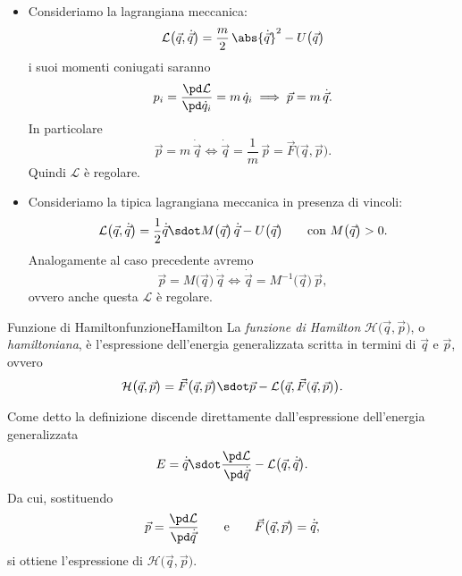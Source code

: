 \begin{ese}
	\begin{itemize}
		\item Consideriamo la lagrangiana meccanica:
		      \[
			      \mathcal{L}\big(\vec{q},\dot{\vec{q}}\big) = \frac{m}{2}\,\abs{\dot{\vec{q}}}^2 -U\big(\vec{q}\big)
		      \]
		      i suoi momenti coniugati saranno
		      \[
			      p_i = \frac{\pd\mathcal{L}}{\pd\dot{q}_i} = m\,\dot{q}_i \implies \vec{p} = m\,\dot{\vec{q}}.
		      \]
		      In particolare
		      \[
			      \vec{p}=m\,\dot{\vec{q}} \iff \dot{\vec{q}} = \frac{1}{m}\,\vec{p} = \vec{F}\big(\vec{q},\vec{p}\big).
		      \]
		      Quindi \(\mathcal{L}\) è regolare.
		\item Consideriamo la tipica lagrangiana meccanica in presenza di vincoli:
		      \[
			      \mathcal{L}\big(\vec{q},\dot{\vec{q}}\big) = \frac{1}{2}\dot{\vec{q}} \sdot M\big(\vec{q}\big)\,\dot{\vec{q}}-U\big(\vec{q}\big) \qquad\text{con }M\big(\vec{q}\big) > 0.
		      \]
		      Analogamente al caso precedente avremo
		      \[
			      \vec{p} = M\big(\vec{q}\big)\,\dot{\vec{q}} \iff \dot{\vec{q}}=M^{-1}\big(\vec{q}\big)\,\vec{p},
		      \]
		      ovvero anche questa \(\mathcal{L}\) è regolare.
	\end{itemize}
\end{ese}

\begin{defn}{Funzione di Hamilton}{funzioneHamilton}
	La \emph{funzione di Hamilton} \(\mathcal{H}\big(\vec{q},\vec{p}\big)\), o \emph{hamiltoniana}, è l'espressione dell'energia generalizzata scritta in termini di \(\vec{q}\) e \(\vec{p}\), ovvero
	\[
		\mathcal{H}\big(\vec{q},\vec{p}\big) = \vec{F}\big(\vec{q},\vec{p}\big) \sdot \vec{p} - \mathcal{L}\big(\vec{q},\vec{F}(\vec{q},\vec{p})\big).
	\]
\end{defn}

\begin{oss}
	Come detto la definizione discende direttamente dall'espressione dell'energia generalizzata
	\[
		E = \dot{\vec{q}} \sdot \frac{\pd\mathcal{L}}{\pd\dot{\vec{q}}} - \mathcal{L}\big(\vec{q},\dot{\vec{q}}\big).
	\]
	Da cui, sostituendo
	\[
		\vec{p} = \frac{\pd\mathcal{L}}{\pd\dot{\vec{q}}} \qquad\text{e}\qquad \vec{F}\big(\vec{q},\vec{p}\big) = \dot{\vec{q}},
	\]
	si ottiene l'espressione di \(\mathcal{H}\big(\vec{q},\vec{p}\big)\).
\end{oss}


